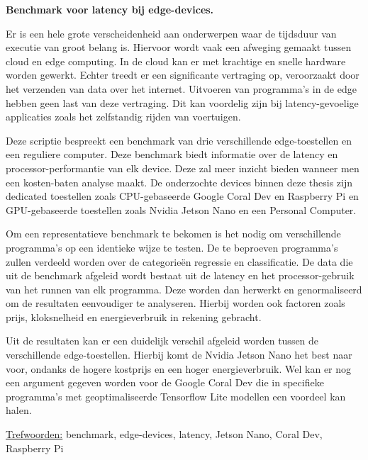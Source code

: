 \textbf{Benchmark voor latency bij edge-devices.}

Er is een hele grote verscheidenheid aan onderwerpen waar de tijdsduur van executie van groot belang is. Hiervoor wordt vaak een afweging gemaakt tussen cloud en edge computing. In de cloud kan er met krachtige en snelle hardware worden gewerkt. Echter treedt er een significante vertraging op, veroorzaakt door het verzenden van data over het internet. Uitvoeren van programma's in de edge hebben geen last van deze vertraging. Dit kan voordelig zijn bij latency-gevoelige applicaties zoals het zelfstandig rijden van voertuigen. 

Deze scriptie bespreekt een benchmark van drie verschillende edge-toestellen en een reguliere computer. Deze benchmark biedt informatie over de latency en processor-performantie van elk device. Deze zal meer inzicht bieden wanneer men een kosten-baten analyse maakt. De onderzochte devices binnen deze thesis zijn dedicated toestellen zoals CPU-gebaseerde Google Coral Dev en Raspberry Pi en GPU-gebaseerde toestellen zoals Nvidia Jetson Nano en een Personal Computer.

Om een representatieve benchmark te bekomen is het nodig om verschillende programma's op een identieke wijze te testen. De te beproeven programma's zullen verdeeld worden over de categorie\"en regressie en classificatie. De data die uit de benchmark afgeleid wordt bestaat uit de latency en het processor-gebruik van het runnen van elk programma. Deze worden dan herwerkt en genormaliseerd om de resultaten eenvoudiger te analyseren. Hierbij worden ook factoren zoals prijs, kloksnelheid en energieverbruik in rekening gebracht.

Uit de resultaten kan er een duidelijk verschil afgeleid worden tussen de verschillende edge-toestellen. Hierbij komt de Nvidia Jetson Nano het best naar voor, ondanks de hogere kostprijs en een hoger energieverbruik. Wel kan er nog een argument gegeven worden voor de Google Coral Dev die in specifieke programma's met geoptimaliseerde Tensorflow Lite modellen een voordeel kan halen.

\underline{Trefwoorden:} benchmark, edge-devices, latency, Jetson Nano, Coral Dev, Raspberry Pi